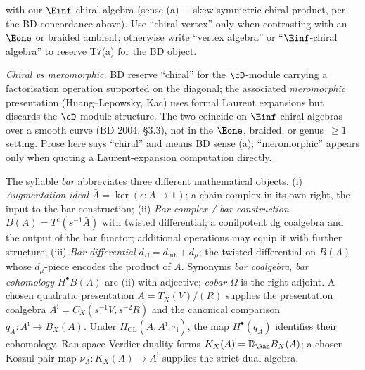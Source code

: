 \begin{description}[itemsep=4pt, leftmargin=2.0em, style=nextline]
\begin{itemize}
with our $\Einf$-chiral algebra (sense (a) $+$ skew-symmetric
chiral product, per the BD concordance above). Use ``chiral
vertex'' only when contrasting with an $\Eone$ or braided
ambient; otherwise write ``vertex algebra'' or
``$\Einf$-chiral algebra'' to reserve T7(a) for the BD object.
\end{itemize}
\emph{Chiral vs meromorphic.} BD reserve ``chiral'' for the
$\cD$-module carrying a factorisation operation supported on the
diagonal; the associated \emph{meromorphic} presentation
(Huang--Lepowsky, Kac) uses formal Laurent expansions but discards
the $\cD$-module structure. The two coincide on $\Einf$-chiral
algebras over a smooth curve (BD 2004, \S3.3), not in the
$\Eone$, braided, or genus~$\ge 1$ setting. Prose here
says ``chiral'' and means BD sense (a); ``meromorphic''
appears only when quoting a Laurent-expansion computation
directly.

\item[T8 (``bar''--three distinct symbols).]
%
The syllable \emph{bar} abbreviates three different mathematical
objects.
(i) \emph{Augmentation ideal} $\bar A = \ker(\epsilon\colon A \to
\mathbf{1})$; a chain complex in its own right, the input to the
bar construction;
(ii) \emph{Bar complex / bar construction} $B(A) = T^c(s^{-1}\bar A)$
with twisted differential; a conilpotent dg coalgebra and the output
of the bar functor; additional operations may equip it with further
structure;
(iii) \emph{Bar differential} $d_B = d_{\mathrm{int}} + d_\mu$; the
twisted differential on $B(A)$ whose $d_\mu$-piece encodes the
product of $A$.
Synonyms \emph{bar coalgebra}, \emph{bar cohomology}
$H^\bullet B(A)$ are (ii) with adjective; \emph{cobar} $\Omega$ is
the right adjoint.  A chosen quadratic presentation
$A=T_X(V)/(R)$ supplies the presentation coalgebra
$A^{\mathrm i}=C_X(s^{-1}V,s^{-2}R)$ and the canonical comparison
$q_A\colon A^{\mathrm i}\to B_X(A)$.  Under
$H_{\mathrm{CL}}(A,A^{\mathrm i},\tau_{\mathrm i})$, the map
$H^\bullet(q_A)$ identifies their cohomology.  Ran-space Verdier
duality forms $K_X(A)=\mathbb D_{\Ran}B_X(A)$; a chosen Koszul-pair
map $\nu_A\colon K_X(A)\to A^!$ supplies the strict dual algebra.


\end{description}
